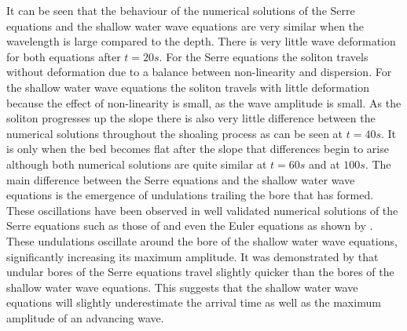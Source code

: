 \documentclass[a4paper,fleqn]{article} %
\begin{document}
It can be seen that the behaviour of the numerical solutions of the Serre equations and the shallow water wave equations are very similar when the wavelength is large compared to the depth. There is very little wave deformation for both equations after $t=20s$. For the Serre equations the soliton travels without deformation due to a balance between non-linearity and dispersion. For the shallow water wave equations the soliton travels with little deformation because the effect of non-linearity is small, as the wave amplitude is small. As the soliton progresses up the slope there is also very little difference between the numerical solutions throughout the shoaling process as can be seen at $t=40s$. It is only when the bed becomes flat after the slope that differences begin to arise although both numerical solutions are quite similar at $t=60s$ and at $100s$. The main difference between the Serre equations and the shallow water wave equations is the emergence of undulations trailing the bore that has formed. These oscillations have been observed in well validated numerical solutions of the Serre equations such as those of \cite{Mitsotakis-etal-2014} and even the Euler equations as shown by \cite{Mitsotakis-etal-2017}. These undulations oscillate around the bore of the shallow water wave equations, significantly increasing its maximum amplitude. It was demonstrated by \cite{Pitt-2017} that undular bores of the Serre equations travel slightly quicker than the bores of the shallow water wave equations. This suggests that the shallow water wave equations will slightly underestimate the arrival time as well as the maximum amplitude of an advancing wave.
\end{document}
